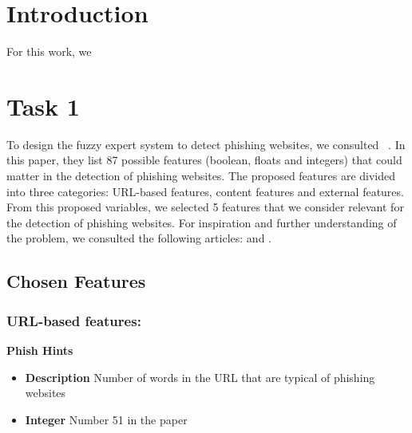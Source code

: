 \documentclass[11pt]{article}
\begin{document}
\tableofcontents
\newpage

\section{Introduction}
For this work, we 

\section{Task 1}
To design the fuzzy expert system to detect phishing websites, we consulted ~\cite{mainpaper}. In this paper, they list 87 possible features (boolean, floats and integers) that could matter in the detection of phishing websites. The proposed features are divided into three categories: URL-based features, content features and external features. From this proposed variables, we selected 5 features that we consider relevant for the detection of phishing websites. For inspiration and further understanding of the problem, we consulted the following articles: \cite{introduction1} and \cite{introduction2}.

\subsection{Chosen Features}


\subsubsection{URL-based features:}
\textbf{Phish Hints} 
\begin{itemize}
    \item \textbf{Description} Number of words in the URL that are typical of phishing websites
    \item \textbf{Integer} Number 51 in the paper
\end{itemize}
\end{document}
